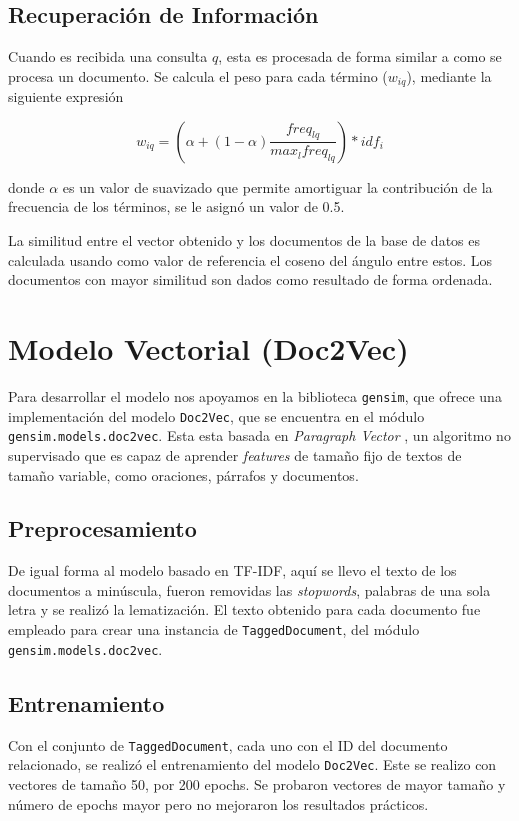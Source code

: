 \documentclass[12pt]{llncs}
\begin{document}
\subsection{Recuperación de Información}

Cuando es recibida una consulta $q$, esta es procesada de forma similar a como se procesa un documento. Se calcula el peso para cada término ($w_{iq}$), mediante la siguiente expresión

$$w_{iq} = (\alpha + (1 - \alpha) \frac{freq_{lq}}{max_l freq_{lq}}) * idf_i$$

donde $\alpha$ es un valor de suavizado que permite amortiguar la contribución de la frecuencia de los términos, se le asignó un valor de 0.5.

La similitud entre el vector obtenido y los documentos de la base de datos es calculada usando como valor de referencia el coseno del ángulo entre estos. Los documentos con mayor similitud son dados como resultado de forma ordenada.


\section{Modelo Vectorial (Doc2Vec)}

Para desarrollar el modelo nos apoyamos en la biblioteca \verb+gensim+, que ofrece una implementación del modelo \verb+Doc2Vec+, que se encuentra en el módulo \verb+gensim.models.doc2vec+. Esta esta basada en \textit{Paragraph Vector} \cite{le2014distributed}, un algoritmo no supervisado que es capaz de aprender \textit{features} de tamaño fijo de textos de tamaño variable, como oraciones, párrafos y documentos. 

\subsection{Preprocesamiento}

De igual forma al modelo basado en TF-IDF, aquí se llevo el texto de los documentos a minúscula, fueron removidas las \textit{stopwords}, palabras de una sola letra y se realizó la lematización. El texto obtenido para cada documento fue empleado para crear una instancia de \verb+TaggedDocument+, del módulo \verb+gensim.models.doc2vec+.

\subsection{Entrenamiento}

Con el conjunto de \verb+TaggedDocument+, cada uno con el ID del documento relacionado, se realizó el entrenamiento del modelo \verb+Doc2Vec+. Este se realizo con vectores de tamaño 50, por 200 epochs. Se probaron vectores de mayor tamaño y número de epochs mayor pero no mejoraron los resultados prácticos.
\end{document}
